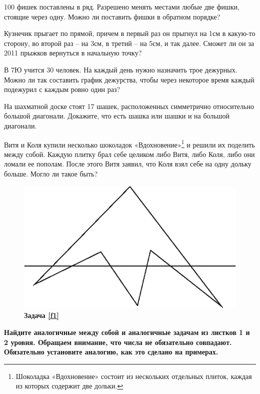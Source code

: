 \begin{thm}100 фишек поставлены в ряд. Разрешено менять местами любые две фишки, стоящие через одну. Можно ли поставить фишки в обратном порядке?
\end{thm}

\begin{thm}
	Кузнечик прыгает по прямой, причем в первый раз он прыгнул на 1см в какую-то сторону, во второй раз – на 3см, в третий – на 5см, и так далее. Сможет ли он за 2011 прыжков вернуться в начальную точку?
\end{thm}

\begin{thm}
	В 7Ю учится 30 человек. На каждый день нужно назначить трое дежурных. Можно ли так составить график дежурства, чтобы через некоторое время каждый подежурил с каждым ровно один раз?
\end{thm}

\begin{thm}
	На шахматной доске стоят 17 шашек, расположенных симметрично относительно большой диагонали. Докажите, что есть шашка или шашки и на большой диагонали.
\end{thm}	

\begin{thm}
	Витя и Коля купили несколько шоколадок «Вдохновение»\footnote{Шоколадка «Вдохновение» состоит из нескольких отдельных плиток, каждая из которых содержит две дольки.} и решили их поделить между собой. Каждую плитку брал себе целиком либо Витя, либо Коля, либо они ломали ее пополам. После этого Витя заявил, что Коля взял себе на одну дольку больше. Могло ли такое быть? 
\end{thm}
\begin{figure}[h]\centering
	\includegraphics[width=8 cm]{./img/six}
	\caption{\textbf{Задача \ref{f1}}}
\end{figure}


\textbf{Найдите аналогичные между собой и аналогичные задачам из листков 1 и 2 уровня. Обращаем внимание, что числа не обязательно совпадают. Обязательно установите аналогию, как это сделано на примерах.}

